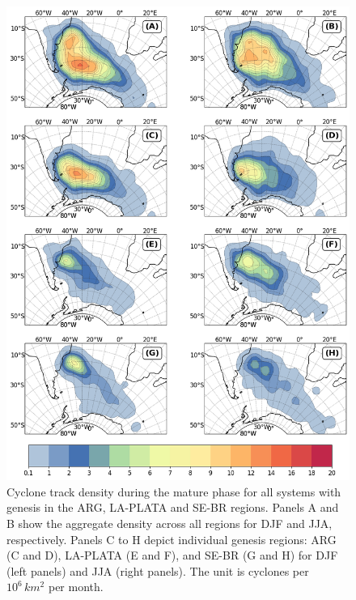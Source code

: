 \begin{figure}[!htbp]
\centering
\includegraphics[width=\textwidth]{figs_4/density_map_mature.png}
\caption[Track Density - Mature Phase]{Cyclone track density during the mature phase for all systems with genesis in the ARG, LA-PLATA and SE-BR regions. Panels A and B show the aggregate density across all regions for DJF and JJA, respectively. Panels C to H depict individual genesis regions: ARG (C and D), LA-PLATA (E and F), and SE-BR (G and H) for DJF (left panels) and JJA (right panels). The unit is cyclones per \(10^6 \, km^2\) per month.}
\label{fig:density_map_mature}
\end{figure}

